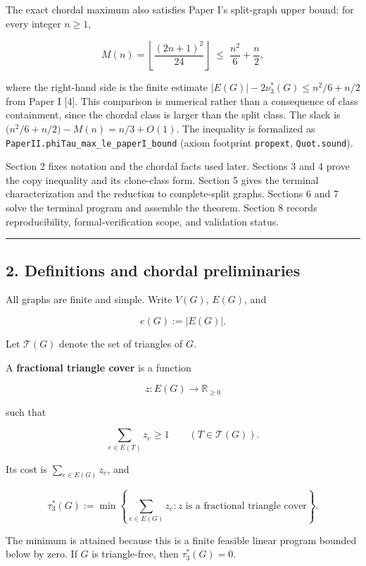 \documentclass[
  american,
  11pt,
  a4paper,
]{article}
\begin{document}
The exact chordal maximum also satisfies Paper I's split-graph upper bound: for every integer \(n\ge1\),

\[
M(n)=\left\lfloor\frac{(2n+1)^2}{24}\right\rfloor
\;\le\;
\frac{n^2}{6}+\frac{n}{2},
\]

where the right-hand side is the finite estimate \(|E(G)|-2\nu_3^*(G)\le n^2/6+n/2\) from Paper I {[}4{]}. This comparison is numerical rather than a consequence of class containment, since the chordal class is larger than the split class. The slack is \(\bigl(n^2/6+n/2\bigr)-M(n)=n/3+O(1)\). The inequality is formalized as
\texttt{PaperII.phiTau\_max\_le\_paperI\_bound} (axiom footprint \texttt{propext}, \texttt{Quot.sound}).

Section 2 fixes notation and the chordal facts used later. Sections 3 and 4 prove the copy inequality and its clone-class form. Section 5 gives the terminal characterization and the reduction to complete-split graphs. Sections 6 and 7 solve the terminal program and assemble the theorem. Section 8 records reproducibility, formal-verification scope, and validation status.

\begin{center}\rule{0.5\linewidth}{0.5pt}\end{center}

\subsection{2. Definitions and chordal preliminaries}\label{definitions-and-chordal-preliminaries}

All graphs are finite and simple. Write \(V(G)\), \(E(G)\), and

\[
e(G):=|E(G)|.
\]

Let \(\mathcal T(G)\) denote the set of triangles of \(G\).

A \textbf{fractional triangle cover} is a function

\[
z:E(G)\longrightarrow\mathbb R_{\ge0}
\]

such that

\[
\sum_{e\in E(T)}z_e\ge1
\qquad
(T\in\mathcal T(G)).
\]

Its cost is \(\sum_{e\in E(G)}z_e\), and

\[
\tau_3^*(G)
:=
\min\left\{
\sum_{e\in E(G)}z_e:
z\text{ is a fractional triangle cover}
\right\}.
\]

The minimum is attained because this is a finite feasible linear program bounded below by zero. If \(G\) is triangle-free, then \(\tau_3^*(G)=0\).
\end{document}
